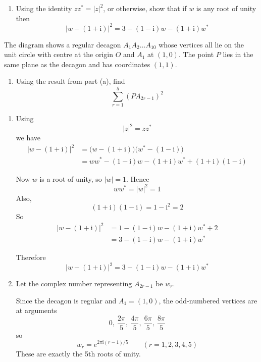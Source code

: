 \documentclass[leqno]{article}
\begin{document}
\begin{enumerate}[
  label=\textbf{\arabic*.},
  leftmargin=*,
  topsep=0pt,
  partopsep=0pt,
  parsep=0pt
]
\begin{enumerate}[label=\textbf{(\alph*)}]
  \item Using the identity $zz^*=|z|^2$, or otherwise, show that if $w$ is any root of unity then
  \[
  |w-(1+\mathrm{i})|^2=3-(1-\mathrm{i})w-(1+\mathrm{i})w^*
  \]
\end{enumerate}
The diagram shows a regular decagon $A_1A_2\ldots A_{10}$ whose vertices all lie on the unit circle with centre at the origin $O$ and $A_1$ at $(1,0)$. The point $P$ lies in the same plane as the decagon and has coordinates $(1,1)$. \\

\begin{enumerate}[label=\textbf{(\alph*)}, resume]
  \item Using the result from part (a), find
\[
\sum_{r=1}^{5}(PA_{2r-1})^2
\]
\end{enumerate}

\vspace*{30pt}

\begin{tcolorbox}[colback=white, colframe=scarlet, title={\textbf{Solution}}, breakable, grow to left by=6mm, grow to right by=10mm]
\begin{enumerate}[label=\textbf{(\alph*)}]
  \item Using
\[
|z|^2=zz^*
\]
we have
\begin{align*}
|w-(1+\mathrm{i})|^2
&=\bigl(w-(1+\mathrm{i})\bigr)\bigl(w^*-(1-\mathrm{i})\bigr) \\
&=ww^*-(1-\mathrm{i})w-(1+\mathrm{i})w^*+(1+\mathrm{i})(1-\mathrm{i})
\end{align*}

Now $w$ is a root of unity, so $|w|=1$. Hence
\[
ww^*=|w|^2=1
\]
Also,
\[
(1+\mathrm{i})(1-\mathrm{i})=1-\mathrm{i}^2=2
\]
So
\begin{align*}
|w-(1+\mathrm{i})|^2
&=1-(1-\mathrm{i})w-(1+\mathrm{i})w^*+2 \\
&=3-(1-\mathrm{i})w-(1+\mathrm{i})w^*
\end{align*}

Therefore
\[
|w-(1+\mathrm{i})|^2 = 3-(1-\mathrm{i})w-(1+\mathrm{i})w^*
\]

  \item Let the complex number representing $A_{2r-1}$ be $w_r$.

Since the decagon is regular and $A_1=(1,0)$, the odd-numbered vertices are at arguments
\[
0,\ \frac{2\pi}{5},\ \frac{4\pi}{5},\ \frac{6\pi}{5},\ \frac{8\pi}{5}
\]
so
\[
w_r=e^{2\pi \mathrm{i}(r-1)/5}\qquad (r=1,2,3,4,5)
\]
These are exactly the 5th roots of unity.


\end{enumerate}
\end{tcolorbox}
\end{enumerate}
\end{document}
